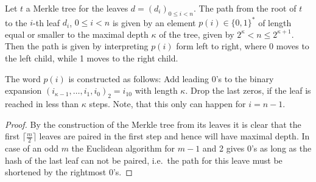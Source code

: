 \begin{lemma}
Let \(t\) a Merkle tree for the leaves \(d = (d_i)_{0 \le i < n}\). The path from 
the root of \(t\) to 
the \(i\)-th leaf \(d_i\), \(0 \le i < n\) is given by 
an element \(p(i) \in \{0,1\}^\ast\) of length equal or smaller to the maximal depth 
\(\kappa\) of the tree, given by 
\(2^\kappa < n \le 2^{\kappa+1}\).
Then the path is given by interpreting \(p(i)\) form left
to right, where 0 moves to the left
child, while 1 moves to the right child. 

The word \(p(i)\) is constructed as follows: Add leading 0's to the 
binary expansion \((i_{\kappa-1},\ldots,i_1,i_0)_2 = i_{10}\) with
length \(\kappa\). Drop the last zeros, if the leaf is reached in less
than \(\kappa\) steps. Note, that this only can happen for \(i=n-1\).
\end{lemma}
\begin{proof}
By the construction of the Merkle tree from its leaves
it is clear that the first \(\lceil\frac{m}{2}\rceil\)
leaves are paired in the first step and hence will have maximal depth.
In case of an odd \(m\) the Euclidean algorithm for \(m-1\)
and 2 gives 0's as long as the hash of the last leaf can not be paired, i.e.\
the path for this leave must be shortened by the rightmost 0's.
\end{proof}
